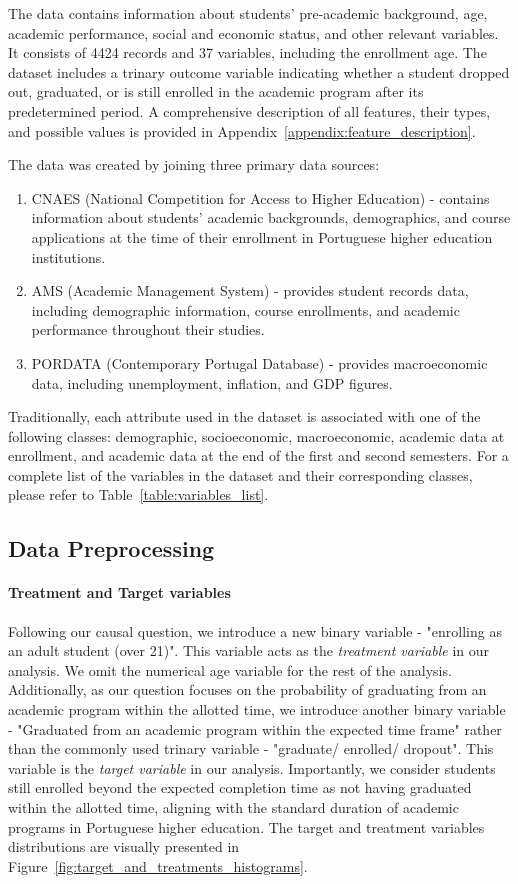\documentclass{article}
\begin{document}
The data contains information about students' pre-academic background, age, academic performance, social and economic status, and other relevant variables. It consists of 4424 records and 37 variables, including the enrollment age. The dataset includes a trinary outcome variable indicating whether a student dropped out, graduated, or is still enrolled in the academic program after its predetermined period. A comprehensive description of all features, their types, and possible values is provided in Appendix~\ref{appendix:feature_description}.

The data was created by joining three primary data sources: 
\begin{enumerate}
    \item CNAES (National Competition for Access to Higher Education) - contains information about students' academic backgrounds, demographics, and course applications at the time of their enrollment in Portuguese higher education institutions.
    \item AMS (Academic Management System) - provides student records data, including demographic information, course enrollments, and academic performance throughout their studies.
    \item PORDATA (Contemporary Portugal Database) - provides macroeconomic data, including unemployment, inflation, and GDP figures.
\end{enumerate}

Traditionally, each attribute used in the dataset is associated with one of the following classes: demographic, socioeconomic, macroeconomic, academic data at enrollment, and academic data at the end of the first and second semesters. For a complete list of the variables in the dataset and their corresponding classes, please refer to Table~\ref{table:variables_list}.

\subsection{Data Preprocessing}

\paragraph{Treatment and Target variables} Following our causal question, we introduce a new binary variable - "enrolling as an adult student (over 21)". This variable acts as the \emph{treatment variable} in our analysis. We omit the numerical age variable for the rest of the analysis. Additionally, as our question focuses on the probability of graduating from an academic program within the allotted time, we introduce another binary variable - "Graduated from an academic program within the expected time frame" rather than the commonly used trinary variable - "graduate/ enrolled/ dropout". This variable is the \emph{target variable} in our analysis. Importantly, we consider students still enrolled beyond the expected completion time as not having graduated within the allotted time, aligning with the standard duration of academic programs in Portuguese higher education. The target and treatment variables distributions are visually presented in Figure~\ref{fig:target_and_treatments_histograms}.
\end{document}
